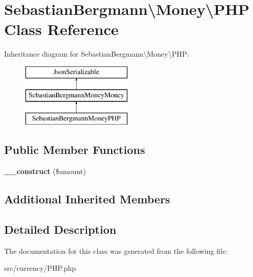 \hypertarget{classSebastianBergmann_1_1Money_1_1PHP}{}\section{Sebastian\+Bergmann\textbackslash{}Money\textbackslash{}P\+H\+P Class Reference}
\label{classSebastianBergmann_1_1Money_1_1PHP}
Inheritance diagram for Sebastian\+Bergmann\textbackslash{}Money\textbackslash{}P\+H\+P\+:\begin{figure}[H]
\begin{center}
\leavevmode
\includegraphics[height=3.000000cm]{classSebastianBergmann_1_1Money_1_1PHP}
\end{center}
\end{figure}
\subsection*{Public Member Functions}
\begin{DoxyCompactItemize}
\item 
\hypertarget{classSebastianBergmann_1_1Money_1_1PHP_a19317b05bab71806ca8821cae7191456}{}{\bfseries \+\_\+\+\_\+construct} (\$amount)\label{classSebastianBergmann_1_1Money_1_1PHP_a19317b05bab71806ca8821cae7191456}

\end{DoxyCompactItemize}
\subsection*{Additional Inherited Members}


\subsection{Detailed Description}


The documentation for this class was generated from the following file\+:\begin{DoxyCompactItemize}
\item 
src/currency/P\+H\+P.\+php\end{DoxyCompactItemize}

